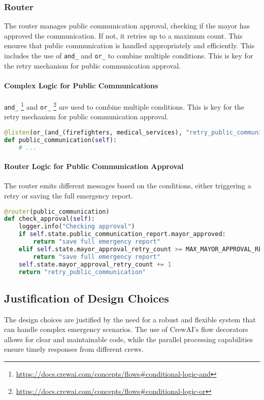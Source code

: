 \subsubsection{Router}
The router manages public communication approval, checking if the mayor has approved the communication. If not, it retries up to a maximum count. This ensures that public communication is handled appropriately and efficiently.
This includes the use of \texttt{and\_} and \texttt{or\_} to combine multiple conditions. This is key for the retry mechanism for public communication approval.

\paragraph{Complex Logic for Public Communications}
\texttt{and\_} \footnote{\url{https://docs.crewai.com/concepts/flows\#conditional-logic-and}} and \texttt{or\_} \footnote{\url{https://docs.crewai.com/concepts/flows\#conditional-logic-or}} are used to combine multiple conditions. This is key for the retry mechanism for public communication approval.

\begin{lstlisting}[language=Python]
@listen(or_(and_(firefighters, medical_services), "retry_public_communication"))
def public_communication(self):
    # ...
\end{lstlisting}

\paragraph{Router Logic for Public Communication Approval}
The router emits different messages based on the conditions, either triggering a retry or saving the full emergency report.

\begin{lstlisting}[language=Python]
@router(public_communication)
def check_approval(self):
    logger.info("Checking approval")
    if self.state.public_communication_report.mayor_approved:
        return "save full emergency report"
    elif self.state.mayor_approval_retry_count >= MAX_MAYOR_APPROVAL_RETRY_COUNT:
        return "save full emergency report"
    self.state.mayor_approval_retry_count += 1
    return "retry_public_communication"
\end{lstlisting}

\subsection{Justification of Design Choices}
The design choices are justified by the need for a robust and flexible system that can handle complex emergency scenarios. The use of CrewAI's flow decorators allows for clear and maintainable code, while the parallel processing capabilities ensure timely responses from different crews.
